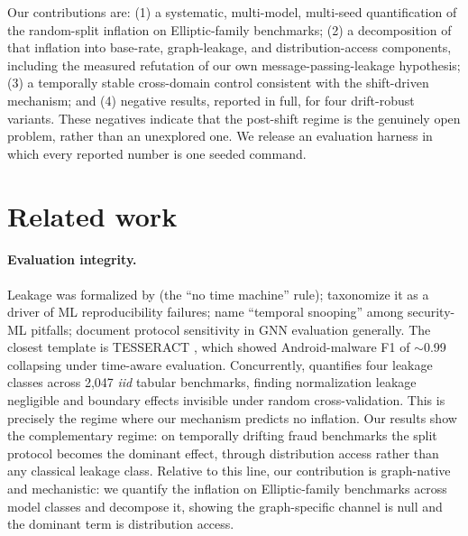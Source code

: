 \documentclass[10pt]{article}
\begin{document}
Our contributions are: (1) a systematic, multi-model, multi-seed quantification of
the random-split inflation on Elliptic-family benchmarks; (2) a decomposition of
that inflation into base-rate, graph-leakage, and distribution-access components,
including the measured refutation of our own message-passing-leakage hypothesis;
(3) a temporally stable cross-domain control consistent with the shift-driven
mechanism; and (4) negative results, reported in full, for four drift-robust variants.
These negatives indicate that the post-shift regime is the genuinely open
problem, rather than an unexplored one. We release an evaluation harness in which
every reported number is one seeded command.

\section{Related work}
\paragraph{Evaluation integrity.} Leakage was formalized by \citet{kaufman2011leakage}
(the ``no time machine'' rule); \citet{kapoor2023leakage} taxonomize it as a driver
of ML reproducibility failures; \citet{arp2022dos} name ``temporal snooping'' among
security-ML pitfalls; \citet{shchur2018pitfalls} document protocol sensitivity in
GNN evaluation generally. The closest template is TESSERACT
\citep{pendlebury2019tesseract}, which showed Android-malware F1 of $\sim$0.99
collapsing under time-aware evaluation. Concurrently, \citet{roth2026leakage}
quantifies four leakage classes across 2{,}047 \emph{iid} tabular benchmarks,
finding normalization leakage negligible and boundary effects invisible under
random cross-validation. This is precisely the regime where our mechanism
predicts no inflation. Our results show the complementary regime: on temporally drifting
fraud benchmarks the split protocol becomes the dominant effect, through
distribution access rather than any classical leakage class. Relative to this
line, our contribution is graph-native and mechanistic: we quantify the inflation
on Elliptic-family benchmarks across model classes and decompose it, showing the
graph-specific channel is null and the dominant term is distribution access.
\end{document}
